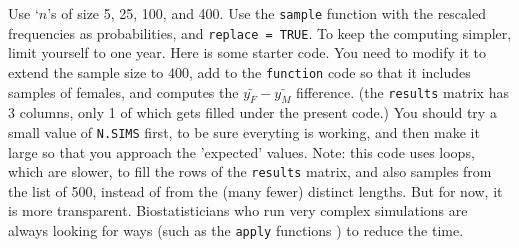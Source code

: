\documentclass[]{book}
\newenvironment{Shaded}{\begin{snugshade}}{\end{snugshade}}
\newcommand{\CommentTok}[1]{\textcolor[rgb]{0.56,0.35,0.01}{\textit{#1}}}
\newcommand{\ControlFlowTok}[1]{\textcolor[rgb]{0.13,0.29,0.53}{\textbf{#1}}}
\newcommand{\DataTypeTok}[1]{\textcolor[rgb]{0.13,0.29,0.53}{#1}}
\newcommand{\DecValTok}[1]{\textcolor[rgb]{0.00,0.00,0.81}{#1}}
\newcommand{\KeywordTok}[1]{\textcolor[rgb]{0.13,0.29,0.53}{\textbf{#1}}}
\newcommand{\NormalTok}[1]{#1}
\newcommand{\OperatorTok}[1]{\textcolor[rgb]{0.81,0.36,0.00}{\textbf{#1}}}
\newcommand{\OtherTok}[1]{\textcolor[rgb]{0.56,0.35,0.01}{#1}}
\newcommand{\StringTok}[1]{\textcolor[rgb]{0.31,0.60,0.02}{#1}}
\begin{document}
\begin{enumerate}
  Use `\(n\)'s of size 5, 25, 100, and 400. Use the \texttt{sample} function with the rescaled frequencies as probabilities, and \texttt{replace\ =\ TRUE}. To keep the computing simpler, limit yourself to one year. Here is some starter code. You need to modify it to extend the sample size to 400, add to the \texttt{function} code so that it includes samples of females, and computes the \(\bar{y_F} - \bar{y_M}\) fifference. (the \texttt{results} matrix has 3 columns, only 1 of which gets filled under the present code.) You should try a small value of \texttt{N.SIMS} first, to be sure everyting is working, and then make it large so that you approach the 'expected' values. Note: this code uses loops, which are slower, to fill the rows of the \texttt{results} matrix, and also samples from the list of 500, instead of from the (many fewer) distinct lengths. But for now, it is more transparent. Biostatisticians who run very complex simulations are always looking for ways (such as the \texttt{apply} functions ) to reduce the time.
\end{enumerate}

\begin{Shaded}
\end{Shaded}
\end{document}
